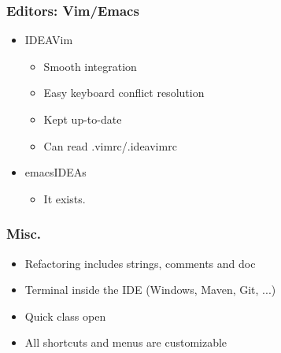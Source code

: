\begin{frame}
  \frametitle{Editors: Vim/Emacs}
  \begin{itemize}
    \item IDEAVim
      \begin{itemize}
        \item Smooth integration
        \item Easy keyboard conflict resolution
        \item Kept up-to-date
        \item Can read .vimrc/.ideavimrc
      \end{itemize}
    \item emacsIDEAs
      \begin{itemize}
        \item It exists.
      \end{itemize}
  \end{itemize}
\end{frame}

\begin{frame}
  \frametitle{Misc.}
  \begin{itemize}
    \item Refactoring includes strings, comments and doc
    \item Terminal inside the IDE (Windows, Maven, Git, ...)
    \item Quick class open
    \item All shortcuts and menus are customizable
  \end{itemize}
\end{frame}

